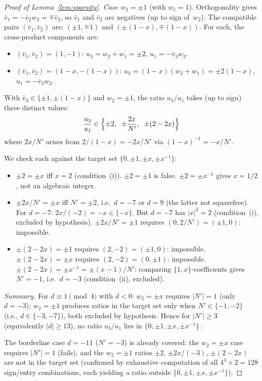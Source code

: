 \documentclass[12pt,a4paper]{article}
\begin{document}
\begin{proof}[Proof of Lemma~\ref{lem:sparsity}]
\emph{Case $w_2 = \pm 1$} (with $w_1 = 1$).
Orthogonality gives $\bar{v}_1 = -\bar{v}_2 w_2 = \mp\bar{v}_2$,
so $\bar{v}_1$ and $\bar{v}_2$ are negatives (up to sign of~$w_2$).
The compatible pairs $(\bar{v}_1, \bar{v}_2)$ are:
$(\pm 1, \mp 1)$ and $(\pm(1{-}x), \mp(1{-}x))$.  For each, the
cross-product components are:
\begin{itemize}
\item $(\bar{v}_1, \bar{v}_2) = (1, -1)$: $u_3 = w_2 + w_1 = \pm 2$,
  $u_1 = -\bar{v}_3 w_2$.
\item $(\bar{v}_1, \bar{v}_2) = (1{-}x, -(1{-}x))$:
  $u_3 = (1{-}x)(w_2 + w_1) = \pm 2(1{-}x)$,
  $u_1 = -\bar{v}_3 w_2$.
\end{itemize}
With $\bar{v}_3 \in \{\pm 1, \pm(1{-}x)\}$ and $w_2 = \pm 1$,
the ratio $u_3/u_1$ takes (up to sign) three distinct values:
\[
  \frac{u_3}{u_1} \in \Bigl\{\pm 2,\;\; \pm\frac{2x}{N'},\;\;
  \pm(2 - 2x)\Bigr\}
\]
where $2x/N'$ arises from $2/(1{-}x) = -2x/N'$ via
$(1{-}x)^{-1} = -x/N'$.

We check each against the target set
$\{0, \pm 1, \pm x, \pm x^{-1}\}$:
\begin{itemize}
\item $\pm 2 = \pm x$ iff $x = 2$ (condition~(i)).
  $\pm 2 = \pm 1$ is false.  $\pm 2 = \pm x^{-1}$ gives
  $x = 1/2$, not an algebraic integer.
\item $\pm 2x/N' = \pm x$ iff $N' = \pm 2$, i.e.\ $d = -7$ or $d = 9$
  (the latter not squarefree).  For $d = -7$:
  $2x/(-2) = -x \in \{-x\}$.  But $d = -7$ has $|x|^2 = 2$
  (condition~(i), excluded by hypothesis).
  $\pm 2x/N' = \pm 1$ requires $(0, 2/N') = (\pm 1, 0)$: impossible.
\item $\pm(2 - 2x) = \pm 1$ requires $(2, -2) = (\pm 1, 0)$:
  impossible.
  $\pm(2 - 2x) = \pm x$ requires $(2, -2) = (0, \pm 1)$: impossible.
  $\pm(2 - 2x) = \pm x^{-1} = \pm(x{-}1)/N'$: comparing
  $\{1,x\}$-coefficients gives $N' = -1$, i.e.\ $d = -3$
  (condition~(ii), excluded).
\end{itemize}

\noindent\emph{Summary.}
For $d \equiv 1 \pmod{4}$ with $d < 0$:
$w_2 = \pm x$ requires $|N'| = 1$ (only $d = -3$);
$w_2 = \pm 1$ produces ratios in the target set only when
$N' \in \{-1, -2\}$ (i.e., $d \in \{-3, -7\}$), both excluded
by hypothesis.  Hence for $|N'| \geq 3$ (equivalently $|d| \geq 13$),
no ratio $u_3/u_1$ lies in $\{0, \pm 1, \pm x, \pm x^{-1}\}$.

The borderline case $d = -11$ ($N' = -3$) is already covered: the
$w_2 = \pm x$ case requires $|N'| = 1$ (fails), and the $w_2 = \pm 1$
ratios $\pm 2$, $\pm 2x/(-3)$, $\pm(2{-}2x)$ are not in the target
set (confirmed by exhaustive computation of all
$4^3 \times 2 = 128$ sign/entry combinations, each yielding a ratio
outside $\{0, \pm 1, \pm x, \pm x^{-1}\}$).


\end{proof}
\end{document}
